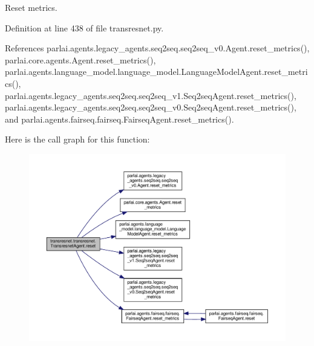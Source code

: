 \begin{DoxyVerb}Reset metrics.\end{DoxyVerb}
 

Definition at line 438 of file transresnet.\+py.



References parlai.\+agents.\+legacy\+\_\+agents.\+seq2seq.\+seq2seq\+\_\+v0.\+Agent.\+reset\+\_\+metrics(), parlai.\+core.\+agents.\+Agent.\+reset\+\_\+metrics(), parlai.\+agents.\+language\+\_\+model.\+language\+\_\+model.\+Language\+Model\+Agent.\+reset\+\_\+metrics(), parlai.\+agents.\+legacy\+\_\+agents.\+seq2seq.\+seq2seq\+\_\+v1.\+Seq2seq\+Agent.\+reset\+\_\+metrics(), parlai.\+agents.\+legacy\+\_\+agents.\+seq2seq.\+seq2seq\+\_\+v0.\+Seq2seq\+Agent.\+reset\+\_\+metrics(), and parlai.\+agents.\+fairseq.\+fairseq.\+Fairseq\+Agent.\+reset\+\_\+metrics().

Here is the call graph for this function\+:
\nopagebreak
\begin{figure}[H]
\begin{center}
\leavevmode
\includegraphics[width=350pt]{classtransresnet_1_1transresnet_1_1TransresnetAgent_ab8b5db45162f69898d1396eeab72e470_cgraph}
\end{center}
\end{figure}
\mbox{\label{classtransresnet_1_1transresnet_1_1TransresnetAgent_acf24e4c4315596f9a4dc14ef044e7dba}} 
